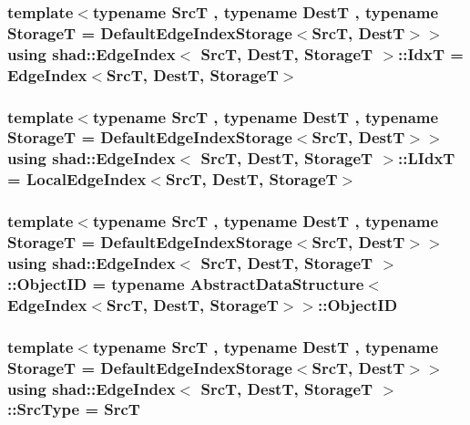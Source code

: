 \hypertarget{classshad_1_1EdgeIndex_a8beb31c05450d63d7add3f9408c9943a}{
\subsubsection[{Idx\-T}]{\setlength{\rightskip}{0pt plus 5cm}template$<$typename Src\-T , typename Dest\-T , typename Storage\-T  = Default\-Edge\-Index\-Storage$<$\-Src\-T, Dest\-T$>$$>$ using {\bf shad\-::\-Edge\-Index}$<$ Src\-T, Dest\-T, Storage\-T $>$\-::{\bf Idx\-T} =  {\bf Edge\-Index}$<$Src\-T, Dest\-T, Storage\-T$>$}}\label{classshad_1_1EdgeIndex_a8beb31c05450d63d7add3f9408c9943a}
\hypertarget{classshad_1_1EdgeIndex_af0fe2f8cb6950ca82e97085c0baedf90}{
\subsubsection[{L\-Idx\-T}]{\setlength{\rightskip}{0pt plus 5cm}template$<$typename Src\-T , typename Dest\-T , typename Storage\-T  = Default\-Edge\-Index\-Storage$<$\-Src\-T, Dest\-T$>$$>$ using {\bf shad\-::\-Edge\-Index}$<$ Src\-T, Dest\-T, Storage\-T $>$\-::{\bf L\-Idx\-T} =  {\bf Local\-Edge\-Index}$<$Src\-T, Dest\-T, Storage\-T$>$}}\label{classshad_1_1EdgeIndex_af0fe2f8cb6950ca82e97085c0baedf90}
\hypertarget{classshad_1_1EdgeIndex_ac1849d1d8dc7f32e2ca56fa224308ef2}{
\subsubsection[{Object\-I\-D}]{\setlength{\rightskip}{0pt plus 5cm}template$<$typename Src\-T , typename Dest\-T , typename Storage\-T  = Default\-Edge\-Index\-Storage$<$\-Src\-T, Dest\-T$>$$>$ using {\bf shad\-::\-Edge\-Index}$<$ Src\-T, Dest\-T, Storage\-T $>$\-::{\bf Object\-I\-D} =  typename {\bf Abstract\-Data\-Structure}$<$ {\bf Edge\-Index}$<$Src\-T, Dest\-T, Storage\-T$>$$>$\-::{\bf Object\-I\-D}}}\label{classshad_1_1EdgeIndex_ac1849d1d8dc7f32e2ca56fa224308ef2}
\hypertarget{classshad_1_1EdgeIndex_a10fd1a7498be01373f022c3e4445bd92}{
\subsubsection[{Src\-Type}]{\setlength{\rightskip}{0pt plus 5cm}template$<$typename Src\-T , typename Dest\-T , typename Storage\-T  = Default\-Edge\-Index\-Storage$<$\-Src\-T, Dest\-T$>$$>$ using {\bf shad\-::\-Edge\-Index}$<$ Src\-T, Dest\-T, Storage\-T $>$\-::{\bf Src\-Type} =  Src\-T}}\label{classshad_1_1EdgeIndex_a10fd1a7498be01373f022c3e4445bd92}


